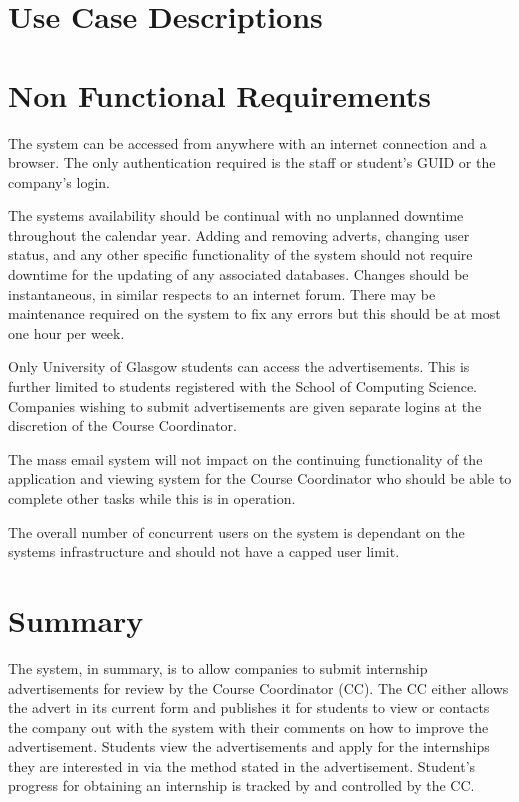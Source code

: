 \documentclass{l3deliverable}
\begin{document}

\section{Use Case Descriptions}



\section{Non Functional Requirements}

The system can be accessed from anywhere with an internet connection and a
browser. The only authentication required is the staff or student's GUID or 
the company's login.

The systems availability should be continual with no unplanned downtime
throughout the calendar year. Adding and removing adverts, changing user status,
and any other specific functionality of the system should not require downtime
for the updating of any associated databases. Changes should be instantaneous,
in similar respects to an internet forum. There may be maintenance required on
the system to fix any errors but this should be at most one hour per week.

Only University of Glasgow students can access the advertisements. This is 
further limited to students registered with the School of Computing Science. 
Companies wishing to submit advertisements are given separate logins at the 
discretion of the Course Coordinator.

The mass email system will not impact on the continuing functionality of the 
application and viewing system for the Course Coordinator who should be able 
to complete other tasks while this is in operation.

The overall number of concurrent users on the system is dependant on the 
systems infrastructure and should not have a capped user limit.



\section{Summary}

The system, in summary, is to allow companies to submit internship
advertisements for review by the Course Coordinator (CC). The CC either 
allows the advert in its current form and publishes it for students to view
or contacts the company out with the system with their comments on how to
improve the advertisement. Students view the advertisements and apply for
the internships they are interested in via the method stated in the
advertisement. Student's progress for obtaining an internship is tracked by
and controlled by the CC.
\end{document}
